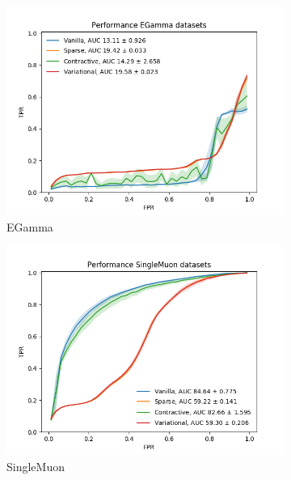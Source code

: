 \begin{figure}[h!]
\centering
    \begin{subfigure}[b]{0.49\linewidth}
        \includegraphics[width=\linewidth]{images/reco/2018/feature_1/performance_EGamma_VanillaSparseContractiveVariational.png}
        \caption{EGamma}
    \end{subfigure}
    \begin{subfigure}[b]{0.49\linewidth}
        \includegraphics[width=\linewidth]{images/reco/2018/feature_1/performance_SingleMuon_VanillaSparseContractiveVariational.png}
        \caption{SingleMuon}
    \end{subfigure}
    \begin{subfigure}[b]{0.49\linewidth}

\end{subfigure}
\end{figure}
